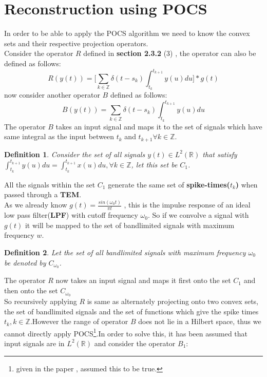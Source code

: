 \documentclass{article}
\newtheorem{defn}{Definition}[section]
\begin{document}
\section{Reconstruction using POCS}
In order to be able to apply the POCS algorithm we need to know the convex sets and their respective projection operators.\\ 
Consider the operator $R$ defined in \textbf{section 2.3.2} (3) , the operator can also be defined as follows:
\begin{equation}
    R(y(t)) = \Big[\sum_{k\in\mathbb{Z}}\delta(t-s_k)\int_{t_k}^{t_{k+1}}y(u)du\Big]*g(t)
\end{equation}
now consider another operator $B$ defined as follows:
\begin{equation}
    B(y(t)) = \sum_{k\in\mathbb{Z}}\delta(t-s_k)\int_{t_k}^{t_{k+1}}y(u)du
\end{equation}
The operator $B$ takes an input signal and maps it to the set of signals which have same integral as the input between $t_k$ and $t_{k+1} \forall k \in \mathbb{Z}$.
\begin{defn}
Consider the set of all signals $y(t)\in L^2(\mathbb{R})$ that satisfy $\int_{t_k}^{t_{k+1}}y(u)du = \int_{t_k}^{t_{k+1}}x(u)du, \forall k \in \mathbb{Z}$, let this set be $C_{1}$.
\end{defn}
All the signals within the set $C_1$ generate the same set of \textbf{spike-times($t_k$)} when passed through a \textbf{TEM}.\\
As we already know $g(t) = \frac{sin(\omega_0 t)}{\pi t}$ , this is the impulse response of an ideal low pass filter(\textbf{LPF}) with cutoff frequency $\omega_0$. So if we convolve a signal with $g(t)$ it will be mapped to the set of bandlimited signals with maximum frequency $w$.\\
\begin{defn}
Let the set of all bandlimited signals with maximum frequency $\omega_0$ be denoted by $C_{\omega_0}$.
\end{defn}
The operator $R$ now takes an input signal and maps it first onto the set $C_1$ and then onto the set $C_{\omega_0}$\\
So recursively applying $R$ is same as alternately projecting onto two convex sets, the set of bandlimited signals and the set of functions which give the spike times ${t_k,k\in\mathbb{Z}}$.However the range of operator $B$ does not lie in a Hilbert space, thus we cannot directly apply POCS\footnote{given in the paper , assumed this to be true.}.In order to solve this, it has been assumed that input signals are in $L^2(\mathbb{R})$ and consider the operator $B_1$:
\end{document}
